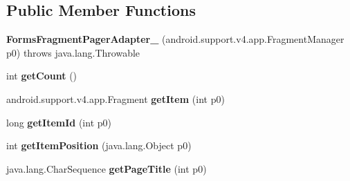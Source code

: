 \subsection*{Public Member Functions}
\begin{DoxyCompactItemize}
\item 
\mbox{\label{classmd5270abb39e60627f0f200893b490a1ade_1_1_forms_fragment_pager_adapter__1_a7ac0bb4a65db4484306e06831a031fed}} 
{\bfseries Forms\+Fragment\+Pager\+Adapter\+\_} (android.\+support.\+v4.\+app.\+Fragment\+Manager p0)  throws java.\+lang.\+Throwable 	
\item 
\mbox{\label{classmd5270abb39e60627f0f200893b490a1ade_1_1_forms_fragment_pager_adapter__1_a99c77886073dcf2434e0cddd4ebe115f}} 
int {\bfseries get\+Count} ()
\item 
\mbox{\label{classmd5270abb39e60627f0f200893b490a1ade_1_1_forms_fragment_pager_adapter__1_acf188451cd28b45334ab835440a9b510}} 
android.\+support.\+v4.\+app.\+Fragment {\bfseries get\+Item} (int p0)
\item 
\mbox{\label{classmd5270abb39e60627f0f200893b490a1ade_1_1_forms_fragment_pager_adapter__1_ad2678a16c4306513316cc5e3f973eb20}} 
long {\bfseries get\+Item\+Id} (int p0)
\item 
\mbox{\label{classmd5270abb39e60627f0f200893b490a1ade_1_1_forms_fragment_pager_adapter__1_a35ec5c3083eb6db927bb57d51c05ed06}} 
int {\bfseries get\+Item\+Position} (java.\+lang.\+Object p0)
\item 
\mbox{\label{classmd5270abb39e60627f0f200893b490a1ade_1_1_forms_fragment_pager_adapter__1_a9e1d408fb9fe541bda794045eea74372}} 
java.\+lang.\+Char\+Sequence {\bfseries get\+Page\+Title} (int p0)
\item 
\mbox{\label{classmd5270abb39e60627f0f200893b490a1ade_1_1_forms_fragment_pager_adapter__1_a1ca53f9ddc8aa628e82b453c1eecc15c}} 

\end{DoxyCompactItemize}
